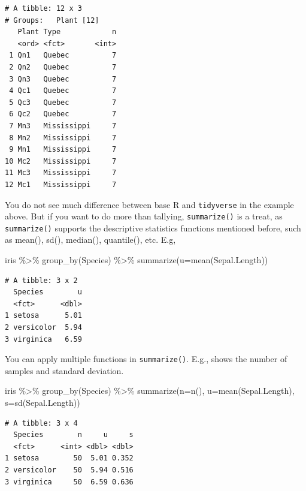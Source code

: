 \documentclass[
  letterpaper,
  DIV=11,
  numbers=noendperiod]{scrreprt}
\newenvironment{Shaded}{\begin{snugshade}}{\end{snugshade}}
\newcommand{\AttributeTok}[1]{\textcolor[rgb]{0.40,0.45,0.13}{#1}}
\newcommand{\FunctionTok}[1]{\textcolor[rgb]{0.28,0.35,0.67}{#1}}
\newcommand{\NormalTok}[1]{\textcolor[rgb]{0.00,0.23,0.31}{#1}}
\newcommand{\SpecialCharTok}[1]{\textcolor[rgb]{0.37,0.37,0.37}{#1}}
\begin{document}
\begin{verbatim}
# A tibble: 12 x 3
# Groups:   Plant [12]
   Plant Type            n
   <ord> <fct>       <int>
 1 Qn1   Quebec          7
 2 Qn2   Quebec          7
 3 Qn3   Quebec          7
 4 Qc1   Quebec          7
 5 Qc3   Quebec          7
 6 Qc2   Quebec          7
 7 Mn3   Mississippi     7
 8 Mn2   Mississippi     7
 9 Mn1   Mississippi     7
10 Mc2   Mississippi     7
11 Mc3   Mississippi     7
12 Mc1   Mississippi     7
\end{verbatim}

You do not see much difference between base R and \texttt{tidyverse} in
the example above. But if you want to do more than tallying,
\texttt{summarize()} is a treat, as \texttt{summarize()} supports the
descriptive statistics functions mentioned before, such as mean(), sd(),
median(), quantile(), etc. E.g,

\begin{Shaded}
\begin{Highlighting}[]
\NormalTok{iris }\SpecialCharTok{\%\textgreater{}\%}
  \FunctionTok{group\_by}\NormalTok{(Species) }\SpecialCharTok{\%\textgreater{}\%}
  \FunctionTok{summarize}\NormalTok{(}\AttributeTok{u=}\FunctionTok{mean}\NormalTok{(Sepal.Length))}
\end{Highlighting}
\end{Shaded}

\begin{verbatim}
# A tibble: 3 x 2
  Species        u
  <fct>      <dbl>
1 setosa      5.01
2 versicolor  5.94
3 virginica   6.59
\end{verbatim}

You can apply multiple functions in \texttt{summarize()}. E.g., shows
the number of samples and standard deviation.

\begin{Shaded}
\begin{Highlighting}[]
\NormalTok{iris }\SpecialCharTok{\%\textgreater{}\%}
  \FunctionTok{group\_by}\NormalTok{(Species) }\SpecialCharTok{\%\textgreater{}\%}
  \FunctionTok{summarize}\NormalTok{(}\AttributeTok{n=}\FunctionTok{n}\NormalTok{(),}
            \AttributeTok{u=}\FunctionTok{mean}\NormalTok{(Sepal.Length),}
            \AttributeTok{s=}\FunctionTok{sd}\NormalTok{(Sepal.Length))}
\end{Highlighting}
\end{Shaded}

\begin{verbatim}
# A tibble: 3 x 4
  Species        n     u     s
  <fct>      <int> <dbl> <dbl>
1 setosa        50  5.01 0.352
2 versicolor    50  5.94 0.516
3 virginica     50  6.59 0.636
\end{verbatim}
\end{document}
